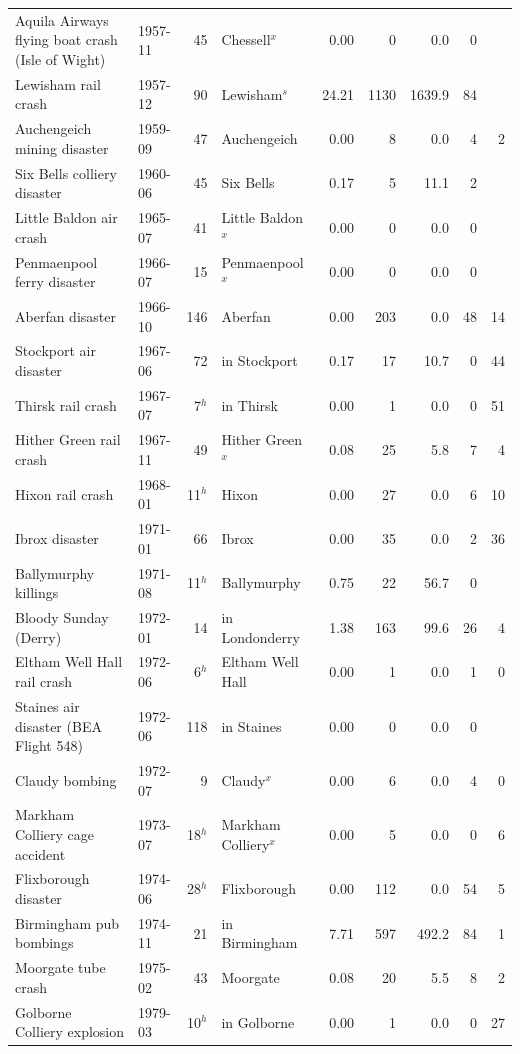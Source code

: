 \documentclass[11pt,a4paper]{article}
\begin{document}
{\begin{longtable}{p{5.2cm}lrlrrrrr}
Aquila Airways flying boat crash (Isle of Wight) & 1957-11 & 45 & Chessell$^x$ & 0.00 & 0 & 0.0 & 0 & \\
Lewisham rail crash & 1957-12 & 90 & Lewisham$^s$ & 24.21 & 1130 & 1639.9 & 84 & \\
Auchengeich mining disaster & 1959-09 & 47 & Auchengeich & 0.00 & 8 & 0.0 & 4 & 2\\
Six Bells colliery disaster & 1960-06 & 45 & Six Bells & 0.17 & 5 & 11.1 & 2 & \\
Little Baldon air crash & 1965-07 & 41 & Little Baldon$^x$ & 0.00 & 0 & 0.0 & 0 & \\
Penmaenpool ferry disaster & 1966-07 & 15 & Penmaenpool$^x$ & 0.00 & 0 & 0.0 & 0 & \\
Aberfan disaster & 1966-10 & 146 & Aberfan & 0.00 & 203 & 0.0 & 48 & 14\\
Stockport air disaster & 1967-06 & 72 & in Stockport & 0.17 & 17 & 10.7 & 0 & 44\\
Thirsk rail crash & 1967-07 & 7$^h$ & in Thirsk & 0.00 & 1 & 0.0 & 0 & 51\\
Hither Green rail crash & 1967-11 & 49 & Hither Green$^x$ & 0.08 & 25 & 5.8 & 7 & 4\\
Hixon rail crash & 1968-01 & 11$^h$ & Hixon & 0.00 & 27 & 0.0 & 6 & 10\\
Ibrox disaster & 1971-01 & 66 & Ibrox & 0.00 & 35 & 0.0 & 2 & 36\\
Ballymurphy killings & 1971-08 & 11$^h$ & Ballymurphy & 0.75 & 22 & 56.7 & 0 & \\
Bloody Sunday (Derry) & 1972-01 & 14 & in Londonderry & 1.38 & 163 & 99.6 & 26 & 4\\
Eltham Well Hall rail crash & 1972-06 & 6$^h$ & Eltham Well Hall & 0.00 & 1 & 0.0 & 1 & 0\\
Staines air disaster (BEA Flight 548) & 1972-06 & 118 & in Staines & 0.00 & 0 & 0.0 & 0 & \\
Claudy bombing & 1972-07 & 9 & Claudy$^x$ & 0.00 & 6 & 0.0 & 4 & 0\\
Markham Colliery cage accident & 1973-07 & 18$^h$ & Markham Colliery$^x$ & 0.00 & 5 & 0.0 & 0 & 6\\
Flixborough disaster & 1974-06 & 28$^h$ & Flixborough & 0.00 & 112 & 0.0 & 54 & 5\\
Birmingham pub bombings & 1974-11 & 21 & in Birmingham & 7.71 & 597 & 492.2 & 84 & 1\\
Moorgate tube crash & 1975-02 & 43 & Moorgate & 0.08 & 20 & 5.5 & 8 & 2\\
Golborne Colliery explosion & 1979-03 & 10$^h$ & in Golborne & 0.00 & 1 & 0.0 & 0 & 27\\

\end{longtable}}
\end{document}
